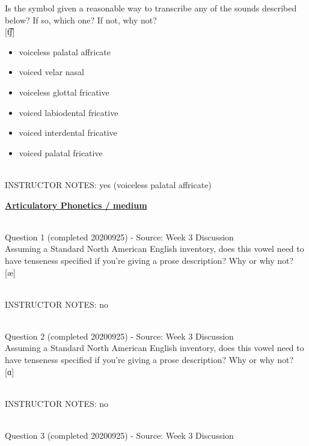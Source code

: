 \documentclass[12pt]{article}
\begin{document}
Is the symbol given a reasonable way to transcribe any of the sounds described below? If so, which one? If not, why not?\\

{[t͡ʃ]}

\begin{itemize} \item voiceless palatal affricate \item voiced velar nasal \item voiceless glottal fricative \item voiced labiodental fricative \item voiced interdental fricative \item voiced palatal fricative \end{itemize}


~\\
INSTRUCTOR NOTES: yes (voiceless palatal affricate)


\newpage\textbf{\underline{\huge Articulatory Phonetics / medium\\}}

~\\

{\large Question 1} (completed 20200925) - Source: Week 3 Discussion\\

Assuming a Standard North American English inventory, does this vowel need to have tenseness specified if you're giving a prose description? Why or why not?\\

{[æ]}


~\\
INSTRUCTOR NOTES: no


~\\

{\large Question 2} (completed 20200925) - Source: Week 3 Discussion\\

Assuming a Standard North American English inventory, does this vowel need to have tenseness specified if you're giving a prose description? Why or why not?\\

{[ɑ]}


~\\
INSTRUCTOR NOTES: no


~\\

{\large Question 3} (completed 20200925) - Source: Week 3 Discussion\\
\end{document}
